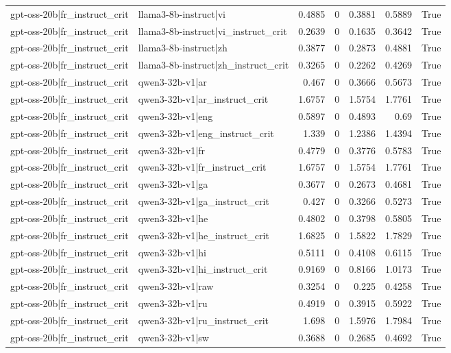 \begin{table}
\begin{tabular}{l l r r r r l}
gpt-oss-20b|fr_instruct_crit & llama3-8b-instruct|vi & 0.4885 & 0 & 0.3881 & 0.5889 & True \\
gpt-oss-20b|fr_instruct_crit & llama3-8b-instruct|vi_instruct_crit & 0.2639 & 0 & 0.1635 & 0.3642 & True \\
gpt-oss-20b|fr_instruct_crit & llama3-8b-instruct|zh & 0.3877 & 0 & 0.2873 & 0.4881 & True \\
gpt-oss-20b|fr_instruct_crit & llama3-8b-instruct|zh_instruct_crit & 0.3265 & 0 & 0.2262 & 0.4269 & True \\
gpt-oss-20b|fr_instruct_crit & qwen3-32b-v1|ar & 0.467 & 0 & 0.3666 & 0.5673 & True \\
gpt-oss-20b|fr_instruct_crit & qwen3-32b-v1|ar_instruct_crit & 1.6757 & 0 & 1.5754 & 1.7761 & True \\
gpt-oss-20b|fr_instruct_crit & qwen3-32b-v1|eng & 0.5897 & 0 & 0.4893 & 0.69 & True \\
gpt-oss-20b|fr_instruct_crit & qwen3-32b-v1|eng_instruct_crit & 1.339 & 0 & 1.2386 & 1.4394 & True \\
gpt-oss-20b|fr_instruct_crit & qwen3-32b-v1|fr & 0.4779 & 0 & 0.3776 & 0.5783 & True \\
gpt-oss-20b|fr_instruct_crit & qwen3-32b-v1|fr_instruct_crit & 1.6757 & 0 & 1.5754 & 1.7761 & True \\
gpt-oss-20b|fr_instruct_crit & qwen3-32b-v1|ga & 0.3677 & 0 & 0.2673 & 0.4681 & True \\
gpt-oss-20b|fr_instruct_crit & qwen3-32b-v1|ga_instruct_crit & 0.427 & 0 & 0.3266 & 0.5273 & True \\
gpt-oss-20b|fr_instruct_crit & qwen3-32b-v1|he & 0.4802 & 0 & 0.3798 & 0.5805 & True \\
gpt-oss-20b|fr_instruct_crit & qwen3-32b-v1|he_instruct_crit & 1.6825 & 0 & 1.5822 & 1.7829 & True \\
gpt-oss-20b|fr_instruct_crit & qwen3-32b-v1|hi & 0.5111 & 0 & 0.4108 & 0.6115 & True \\
gpt-oss-20b|fr_instruct_crit & qwen3-32b-v1|hi_instruct_crit & 0.9169 & 0 & 0.8166 & 1.0173 & True \\
gpt-oss-20b|fr_instruct_crit & qwen3-32b-v1|raw & 0.3254 & 0 & 0.225 & 0.4258 & True \\
gpt-oss-20b|fr_instruct_crit & qwen3-32b-v1|ru & 0.4919 & 0 & 0.3915 & 0.5922 & True \\
gpt-oss-20b|fr_instruct_crit & qwen3-32b-v1|ru_instruct_crit & 1.698 & 0 & 1.5976 & 1.7984 & True \\
gpt-oss-20b|fr_instruct_crit & qwen3-32b-v1|sw & 0.3688 & 0 & 0.2685 & 0.4692 & True \\

\end{tabular}
\end{table}
